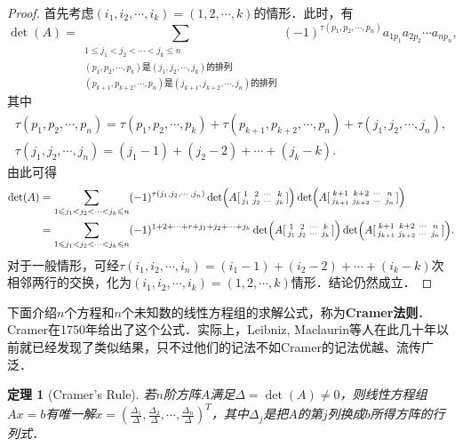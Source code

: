 \documentclass[a4paper,fontset=windows]{ctexbook}
\newtheorem{theorem}{定理}[chapter]
\theoremstyle{definition}
\renewcommand{\le}{\leqslant}
\begin{document}
\begin{proof}
首先考虑$(i_1,i_2,\cdots,i_k)=(1,2,\cdots,k)$的情形．此时，有
$$\det(A)=\sum_{\substack{1\le j_1<j_2<\cdots<j_k\le n \\ (p_1,p_2,\cdots,p_k)\text{是}(j_1,j_2,\cdots,j_k)\text{的排列} \\ (p_{k+1},p_{k+2},\cdots,p_n)\text{是}(j_{k+1},j_{k+2},\cdots,j_n)\text{的排列}}}(-1)^{\tau(p_1,p_2,\cdots,p_n)}a_{1p_1}a_{2p_2}\cdots a_{np_n},$$
其中
\begin{gather*}
\tau(p_1,p_2,\cdots,p_n)=\tau(p_1,p_2,\cdots,p_k)+\tau(p_{k+1},p_{k+2},\cdots,p_n)+\tau(j_1,j_2,\cdots,j_n), \\
\tau(j_1,j_2,\cdots,j_n)=(j_1-1)+(j_2-2)+\cdots+(j_k-k).
\end{gather*}
由此可得
\begin{align*}
\det(A)&=\sum_{1\le j_1<j_2<\cdots<j_k\le n}(-1)^{\tau(j_1,j_2,\cdots,j_n)}\det\Bigl(A[\begin{smallmatrix}1&2&\cdots&k \\ j_1&j_2&\cdots&j_k\end{smallmatrix}]\Bigr)\det\Bigl(A[\begin{smallmatrix}k+1&k+2&\cdots&n \\ j_{k+1}&j_{k+2}&\cdots&j_n\end{smallmatrix}]\Bigr) \\
&=\sum_{1\le j_1<j_2<\cdots<j_k\le n}(-1)^{1+2+\cdots+r+j_1+j_2+\cdots+j_k}\det\Bigl(A[\begin{smallmatrix}1&2&\cdots&k \\ j_1&j_2&\cdots&j_k\end{smallmatrix}]\Bigr)\det\Bigl(A[\begin{smallmatrix}k+1&k+2&\cdots&n \\ j_{k+1}&j_{k+2}&\cdots&j_n\end{smallmatrix}]\Bigr).
\end{align*}
对于一般情形，可经$\tau(i_1,i_2,\cdots,i_n)=(i_1-1)+(i_2-2)+\cdots+(i_k-k)$次相邻两行的交换，化为$(i_1,i_2,\cdots,i_k)=(1,2,\cdots,k)$情形．结论仍然成立．
\end{proof}

下面介绍$n$个方程和$n$个未知数的线性方程组的求解公式，称为{\bf Cramer法则}．Cramer在1750年给出了这个公式．实际上，Leibniz, Maclaurin等人在此几十年以前就已经发现了类似结果，只不过他们的记法不如Cramer的记法优越、流传广泛．

\begin{theorem}[Cramer's Rule]
若$n$阶方阵$A$满足$\Delta=\det(A)\ne 0$，则线性方程组$Ax=b$有唯一解$x=(\frac{\Delta_1}{\Delta},\frac{\Delta_2}{\Delta},\cdots,\frac{\Delta_n}{\Delta})^T$，其中$\Delta_j$是把$A$的第$j$列换成$b$所得方阵的行列式．
\end{theorem}
\end{document}
